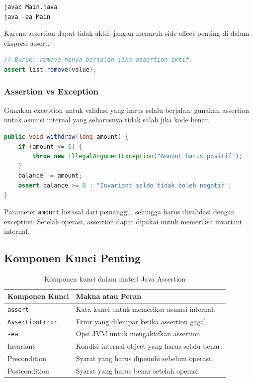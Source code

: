 \begin{lstlisting}[caption={Menjalankan program dengan assertion aktif}, label={lst:enable-assertion}]
javac Main.java
java -ea Main
\end{lstlisting}

Karena assertion dapat tidak aktif, jangan menaruh side effect penting di dalam ekspresi assert.

\begin{lstlisting}[language=Java, caption={Assertion dengan side effect yang buruk}, label={lst:assert-side-effect}]
// Buruk: remove hanya berjalan jika assertion aktif.
assert list.remove(value);
\end{lstlisting}

\subsubsection{Assertion vs Exception}

\begin{jawab}
Gunakan exception untuk validasi yang harus selalu berjalan; gunakan assertion untuk asumsi internal yang seharusnya tidak salah jika kode benar.
\end{jawab}

\begin{lstlisting}[language=Java, caption={Exception untuk validasi public method}, label={lst:exception-not-assert}]
public void withdraw(long amount) {
    if (amount <= 0) {
        throw new IllegalArgumentException("Amount harus positif");
    }
    balance -= amount;
    assert balance >= 0 : "Invariant saldo tidak boleh negatif";
}
\end{lstlisting}

Parameter \texttt{amount} berasal dari pemanggil, sehingga harus divalidasi dengan exception. Setelah operasi, assertion dapat dipakai untuk memeriksa invariant internal.

\subsection{Komponen Kunci Penting}

\begin{table}[H]
\centering
\begin{tabularx}{\textwidth}{|L{0.28\textwidth}|X|}
\hline
\textbf{Komponen Kunci} & \textbf{Makna atau Peran} \\
\hline
\texttt{assert} & Kata kunci untuk memeriksa asumsi internal. \\
\hline
\texttt{AssertionError} & Error yang dilempar ketika assertion gagal. \\
\hline
\texttt{-ea} & Opsi JVM untuk mengaktifkan assertion. \\
\hline
Invariant & Kondisi internal object yang harus selalu benar. \\
\hline
Precondition & Syarat yang harus dipenuhi sebelum operasi. \\
\hline
Postcondition & Syarat yang harus benar setelah operasi. \\
\hline
\end{tabularx}
\caption{Komponen kunci dalam materi Java Assertion}
\label{tab:komponen-kunci-java-assertion}
\end{table}

